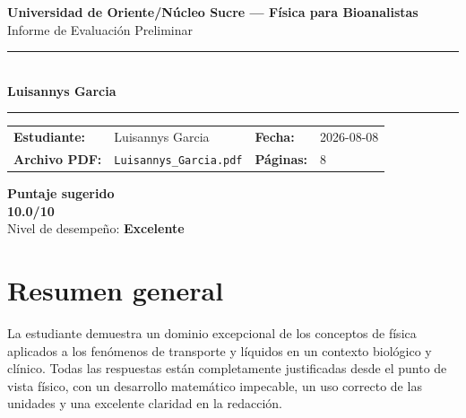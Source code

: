 \documentclass[11pt,a4paper]{article}
\begin{document}
\begin{center}
  {\Large\bfseries\color{azulTitulo} Universidad de Oriente/Núcleo Sucre --- Física para Bioanalistas}\\[4pt]
  {\large Informe de Evaluación Preliminar}\\[12pt]
  \rule{\linewidth}{1.2pt}\\[6pt]
  {\LARGE\bfseries Luisannys Garcia}\\[4pt]
  \rule{\linewidth}{0.6pt}
\end{center}

\vspace{4pt}
\begin{tcolorbox}[cajaTitulo, title=Datos del informe]
\begin{tabular}{@{}llll@{}}
  \textbf{Estudiante:}  & Luisannys Garcia  &
  \textbf{Fecha:}       & 2026-08-08 \\[4pt]
  \textbf{Archivo PDF:} & \texttt{Luisannys\_Garcia.pdf}  &
  \textbf{Páginas:}     & 8 \\
\end{tabular}
\end{tcolorbox}

\vspace{6pt}
\begin{center}
  \begin{tcolorbox}[
    enhanced,
    colback=white, colframe=desempeno_excelente,
    width=0.62\linewidth,
    boxrule=2pt,
    halign=center, valign=center,
    top=8pt, bottom=8pt,
  ]
    \centering
    {\large\bfseries Puntaje sugerido}\\[6pt]
    {\Huge\bfseries\color{desempeno_excelente} 10.0/10}\\[6pt]
    {\large Nivel de desempeño: \textbf{\color{desempeno_excelente} Excelente}}
  \end{tcolorbox}
\end{center}

\section*{Resumen general}
La estudiante demuestra un dominio excepcional de los conceptos de física aplicados a los fenómenos de transporte y líquidos en un contexto biológico y clínico. Todas las respuestas están completamente justificadas desde el punto de vista físico, con un desarrollo matemático impecable, un uso correcto de las unidades y una excelente claridad en la redacción.
\end{document}

